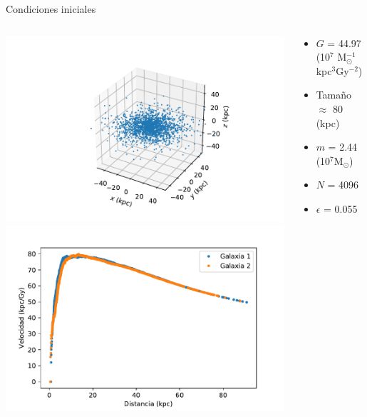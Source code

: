 \documentclass{beamer}
\begin{document}
\begin{frame}{Condiciones iniciales}
	\begin{columns}
		\begin{column}{0.5\textwidth}
			\includegraphics[height=0.35\textheight]{sources/images/galaxy_shape.pdf}\\
			\includegraphics[height=0.35\textheight]{sources/images/rotation_curve.pdf}
		\end{column}
		\begin{column}{0.65\textwidth}
			\footnotesize
			\begin{itemize}
				\item $G$ = 44.97 (10$^7$ M$_{\odot}^{-1}$kpc$^3$Gy$^{-2}$)
				\item Tama\~no $\approx$ 80 (kpc)
				\item $m$ = 2.44 (10$^7$M$_{\odot}$)
				\item $N$ = 4096
				\item $\epsilon$ = 0.055
			\end{itemize}
		\end{column}
	\end{columns}
\end{frame}
\end{document}
